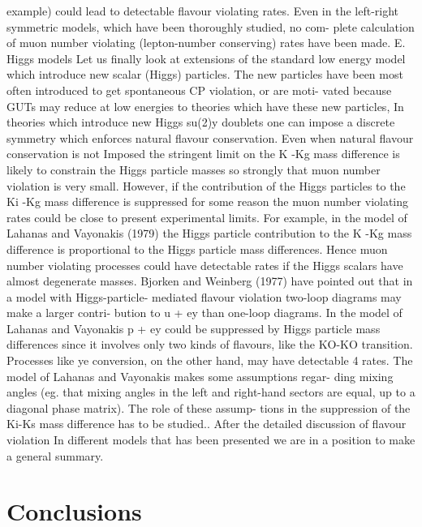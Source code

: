 \documentclass[twoside]{article}
\begin{document}
{{{{{{{{{{{{{{{{example) could lead to detectable flavour violating rates. Even in the
left-right symmetric models, which have been thoroughly studied, no com-
plete calculation of muon number violating (lepton-number conserving)
rates have been made.
E. Higgs models
Let us finally look at extensions of the standard low energy model
which introduce new scalar (Higgs) particles. The new particles have
been most often introduced to get spontaneous CP violation, or are moti-
vated because GUTs may reduce at low energies to theories which have
these new particles, In theories which introduce new Higgs su(2)y
doublets one can impose a discrete symmetry which enforces natural flavour
conservation. Even when natural flavour conservation is not Imposed
the stringent limit on the K -Kg mass difference is likely to constrain
the Higgs particle masses so strongly that muon number violation is very
small. However, if the contribution of the Higgs particles to the Ki -Kg
mass difference is suppressed for some reason the muon number violating
rates could be close to present experimental limits. For example, in
the model of Lahanas and Vayonakis (1979) the Higgs particle contribution
to the K -Kg mass difference is proportional to the Higgs particle mass
differences. Hence muon number violating processes could have detectable
rates if the Higgs scalars have almost degenerate masses. Bjorken and
Weinberg (1977) have pointed out that in a model with Higgs-particle-
mediated flavour violation two-loop diagrams may make a larger contri-
bution to u + ey than one-loop diagrams. In the model of Lahanas and
Vayonakis p + ey could be suppressed by Higgs particle mass differences
since it involves only two kinds of flavours, like the KO-KO transition.
Processes like ye conversion, on the other hand, may have detectable
4 
rates. The model of Lahanas and Vayonakis makes some assumptions regar-
ding mixing angles (eg. that mixing angles in the left and right-hand
sectors are equal, up to a diagonal phase matrix). The role of these assump-
tions in the suppression of the Ki-Ks mass difference has to be studied..
After the detailed discussion of flavour violation In different models
that has been presented we are in a position to make a general summary.

\section{\label{sec5}Conclusions}

}}}}}}}}}}}}}}}}
\end{document}
